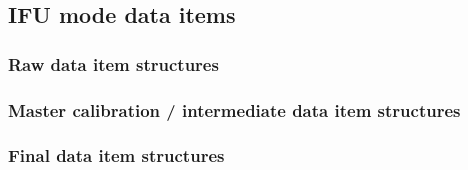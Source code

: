 \subsection{IFU mode data items}\label{ssec:lms_drl_items_structures}
\subsubsection{Raw data item structures}\label{sssec:lmsrawdatastructs}
\subsubsection{Master calibration / intermediate data item structures}\label{sssec:lmsprocdatastructs}
\subsubsection{Final data item structures}\label{sssec:lmsfinaldatastructs}\paragraph{\hyperref[dataitem:ifu_sci_reduced_tac]{}}\label{dataitem:ifu_sci_reduced_tac}


\paragraph{\hyperref[dataitem:master_flat_ifu]{}}\label{dataitem:master_flat_ifu}


\paragraph{\hyperref[dataitem:ifu_wavecal]{}}\label{dataitem:ifu_wavecal}


\paragraph{\hyperref[dataitem:ifu_sci_combined]{}}\label{dataitem:ifu_sci_combined}


